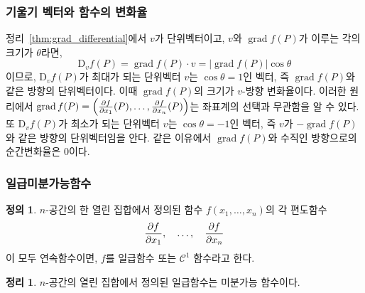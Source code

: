 \documentclass[unfonts,oneside,a4paper]{oblivoir}
\theoremstyle{definition}
\newtheorem{definition}{정의}[subsubsection]
\theoremstyle{theorem}
\newtheorem{theorem}{정리}[subsubsection]
\renewcommand{\vec}[1]{\bm{\mathit{#1}}}
\newcommand{\dD}{\mathrm{D}}
\DeclareMathOperator{\grad}{grad}
\begin{document}
\subsubsection{기울기 벡터와 함수의 변화율}
정리~\ref{thm:grad_differential}에서 $\vec v$가 단위벡터이고, $\vec v$와 $\grad f(P)$가 이루는 각의 크기가 $\theta$라면,
\begin{equation*}
    \dD_{\vec v} f(P) = \grad f(P) \cdot \vec v = |\grad f(P)| \cos \theta
\end{equation*}
이므로, $\dD_{\vec v} f(P)$가 최대가 되는 단위벡터 $\vec v$는 $\cos \theta = 1$인 벡터, 즉 $\grad f(P)$와 같은 방향의 단위벡터이다.
이때 $\grad f(P)$의 크기가 $\vec v$-방향 변화율이다.
이러한 원리에서 $\grad f(P) = \left(\diffp{f}{x_1}(P), \dots, \diffp{f}{x_n}(P)\right)$는 좌표계의 선택과 무관함을 알 수 있다.
또 $\dD_{\vec v} f(P)$가 최소가 되는 단위벡터 $\vec v$는 $\cos \theta = -1$인 벡터, 즉 $\vec v$가 $- \grad f(P)$와 같은 방향의 단위벡터임을 안다.
같은 이유에서 $\grad f(P)$와 수직인 방향으로의 순간변화율은 $0$이다.

\subsubsection{일급미분가능함수}

\begin{definition}
    $n$-공간의 한 열린 집합에서 정의된 함수 $f(x_1, \dots, x_n)$의 각 편도함수
    \begin{equation*}
        \diffp{f}{x_1},\quad\dots,\quad \diffp{f}{x_n}
    \end{equation*}
    이 모두 연속함수이면, $f$를 일급함수 또는 $\mathcal C^1$ 함수라고 한다.
\end{definition}

\begin{theorem}
    $n$-공간의 열린 집합에서 정의된 일급함수는 미분가능 함수이다.
\end{theorem}
\end{document}
